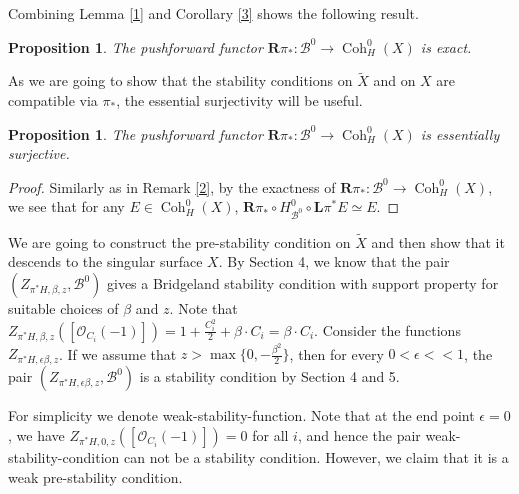 \documentclass[12pt]{amsart}
\newtheorem{proposition}[theorem]{Proposition}
\theoremstyle{definition}
\DeclareMathOperator{\Coh}{Coh}
\begin{document}
Combining Lemma \ref{1} and Corollary \ref{3} shows the following result.

\begin{proposition}\label{pushforward}
The pushforward functor $\mathbf{R}\pi_\ast \colon \mathcal{B}^0 \longrightarrow \Coh^0_H(X)$ is exact.
\end{proposition}


As we are going to show that the stability conditions on $\widetilde{X}$ and on $X$ are compatible via $\pi_\ast$,
the essential surjectivity will be useful.

\begin{proposition}\label{esurj}
The pushforward functor $\mathbf{R}\pi_\ast \colon \mathcal{B}^0\longrightarrow \Coh^0_H(X)$ is essentially surjective.
\end{proposition}
\begin{proof}
Similarly as in Remark \ref{2}, 
by the exactness of $\mathbf{R}\pi_\ast \colon \mathcal{B}^0 \longrightarrow \Coh^0_H(X)$,
we see that for any $E \in \Coh^0_H(X)$,
$\mathbf{R}\pi_\ast \circ H^0_{\mathcal{B}^0} \circ \mathbf{L}\pi^\ast E \simeq E$.
\end{proof}


We are going to construct the pre-stability condition on $\widetilde{X}$ and then show that it descends to the singular surface $X$.
By Section 4, we know that the pair $(Z_{\pi^\ast H,\beta,z}, \mathcal{B}^0)$ gives a Bridgeland stability condition with support property for suitable choices of $\beta$ and $z$.
Note that $Z_{\pi^\ast H ,\beta,z}([\mathcal{O}_{C_i}(-1)])=1+\frac{C_i^2}{2}+\beta \cdot C_i=\beta \cdot C_i$.
Consider the functions $Z_{\pi^\ast H,\epsilon\beta,z}$.
If we assume that $z>\max \{0, -\frac{\beta^2}{2} \}$, then for every $0<\epsilon<<1$, the pair $(Z_{\pi^\ast H,\epsilon\beta,z},\mathcal{B}^0)$ is a stability condition by Section 4 and 5. 

For simplicity we denote \gls{weak-stability-function}.
Note that at the end point $\epsilon = 0$,
we have $Z_{\pi^\ast H,0,z}([\mathcal{O}_{C_i}(-1)])=0$ for all $i$,
and hence the pair \gls{weak-stability-condition} can not be a stability condition. 
However, we claim that it is a weak pre-stability condition.
\end{document}
